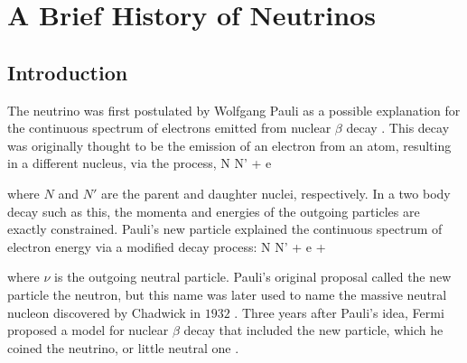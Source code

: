 
\chapter{A Brief History of Neutrinos}
\label{ch:Hist}


\section{Introduction}
\label{sec:HistIntro}

The neutrino was first postulated by Wolfgang Pauli as a possible explanation for the continuous spectrum of electrons emitted from nuclear $\beta$ decay \cite{ref:Pauli}. This decay was originally thought to be the emission of an electron from an atom, resulting in a different nucleus, via the process,
\beq
N \rightarrow N' + e
\label{eq:BetaWrong}
\eeq

\n where $N$ and $N'$ are the parent and daughter nuclei, respectively. In a two body decay such as this, the momenta and energies of the outgoing particles are exactly constrained. Pauli's new particle explained the continuous spectrum of electron energy via a modified decay process:
\beq
N \rightarrow N' + e + \nu
\label{eq:BetaRight}
\eeq

\n where $\nu$ is the outgoing neutral particle. Pauli's original proposal called the new particle the neutron, but this name was later used to name the massive neutral nucleon discovered by Chadwick in $1932$ \cite{ref:Chadwick}. Three years after Pauli's idea, Fermi proposed a model for nuclear $\beta$ decay that included the new particle, which he coined the neutrino, or little neutral one \cite{ref:Fermi}.

